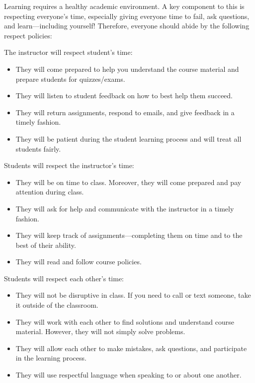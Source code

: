 \documentclass[11pt,letterpaper]{article}
\begin{document}
\newpage






Learning requires a healthy academic environment. A key component to this is respecting everyone's time, especially giving everyone time to fail, ask questions, and learn---including yourself! Therefore, everyone should abide by the following respect policies: \pspace

The instructor will respect student's time:
	\begin{itemize}
	\item They will come prepared to help you understand the course material and prepare students for quizzes/exams. 
	\item They will listen to student feedback on how to best help them succeed. 
	\item They will return assignments, respond to emails, and give feedback in a timely fashion. 
	\item They will be patient during the student learning process and will treat all students fairly. 
	\end{itemize} \pspace

Students will respect the instructor's time:
	\begin{itemize}
	\item They will be on time to class. Moreover, they will come prepared and pay attention during class. 
	\item They will ask for help and communicate with the instructor in a timely fashion. 
	\item They will keep track of assignments---completing them on time and to the best of their ability.  
	\item They will read and follow course policies. 
	\end{itemize} \pspace

Students will respect each other's time:
	\begin{itemize}
	\item They will not be disruptive in class. If you need to call or text someone, take it outside of the classroom. 
	\item They will work with each other to find solutions and understand course material. However, they will not simply solve problems. 
	\item They will allow each other to make mistakes, ask questions, and participate in the learning process. 
	\item They will use respectful language when speaking to or about one another. 
	\end{itemize}
\sectionbreak
\end{document}
